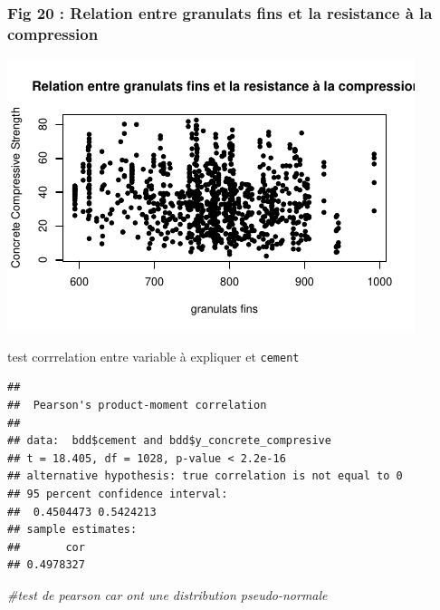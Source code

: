 \documentclass[
  12pt,
]{article}
\newenvironment{Shaded}{\begin{snugshade}}{\end{snugshade}}
\newcommand{\AttributeTok}[1]{\textcolor[rgb]{0.13,0.29,0.53}{#1}}
\newcommand{\CommentTok}[1]{\textcolor[rgb]{0.56,0.35,0.01}{\textit{#1}}}
\newcommand{\FunctionTok}[1]{\textcolor[rgb]{0.13,0.29,0.53}{\textbf{#1}}}
\newcommand{\NormalTok}[1]{#1}
\newcommand{\SpecialCharTok}[1]{\textcolor[rgb]{0.81,0.36,0.00}{\textbf{#1}}}
\newcommand{\StringTok}[1]{\textcolor[rgb]{0.31,0.60,0.02}{#1}}
\begin{document}
\subsubsection{Fig 20 : Relation entre granulats fins et la resistance à
la
compression}\label{fig-20-relation-entre-granulats-fins-et-la-resistance-uxe0-la-compression}

\begin{center}\includegraphics{rmd_final_files/figure-latex/unnamed-chunk-40-1} \end{center}

test corrrelation entre variable à expliquer et \texttt{cement}

\begin{Shaded}
\end{Shaded}

\begin{verbatim}
## 
##  Pearson's product-moment correlation
## 
## data:  bdd$cement and bdd$y_concrete_compresive
## t = 18.405, df = 1028, p-value < 2.2e-16
## alternative hypothesis: true correlation is not equal to 0
## 95 percent confidence interval:
##  0.4504473 0.5424213
## sample estimates:
##       cor 
## 0.4978327
\end{verbatim}

\begin{Shaded}
\begin{Highlighting}[]
\CommentTok{\#test de pearson car ont une distribution pseudo{-}normale}
\end{Highlighting}
\end{Shaded}
\end{document}
